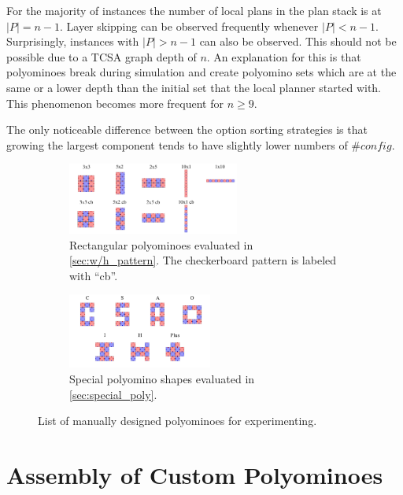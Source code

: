 For the majority of instances the number of local plans in the plan stack is at $|P| = n-1$.
Layer skipping can be observed frequently whenever $|P| < n-1$.
Surprisingly, instances with $|P| > n-1$ can also be observed.
This should not be possible due to a TCSA graph depth of $n$.
An explanation for this is that polyominoes break during simulation and create polyomino sets which are at the same or a lower depth than the initial set that the local planner started with.
This phenomenon becomes more frequent for $n \geq 9$.

The only noticeable difference between the option sorting strategies is that growing the largest component tends to have slightly lower numbers of $\#\textit{config}$.

\begin{figure}
	\centering
	\begin{subfigure}[b]{\textwidth}
		\centering
		\includegraphics[width=0.62\textwidth]{figures/AFTS_cb_shapes.pdf}
		\caption{Rectangular polyominoes evaluated in \autoref{sec:w/h_pattern}. The checkerboard pattern is labeled with ``cb''. \hfill}
		\label{fig:AFTS_cb_shapes}
	\end{subfigure}
	\begin{subfigure}[b]{\textwidth}
		\centering
		\includegraphics[width=0.52\textwidth]{figures/AFTS_sp_shapes.pdf}
		\caption{Special polyomino shapes evaluated in \autoref{sec:special_poly}.}
		\label{fig:AFTS_sp_shapes}
	\end{subfigure}
	\caption[List of manually designed polyominoes for experimenting]{List of manually designed polyominoes for experimenting.}
	\label{fig:AFTS_shapes}
\end{figure}

\section{Assembly of Custom Polyominoes}
\label{sec:AFTS}

